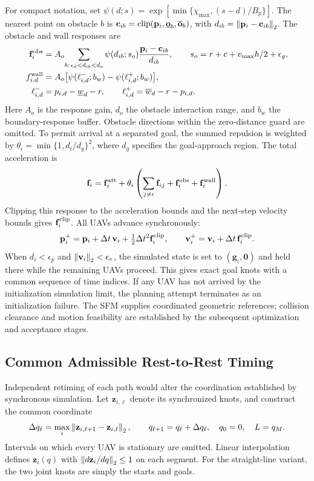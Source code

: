 For compact notation, set $\psi(d;s)=\exp[\min\{\chi_{\max},(s-d)/B_p\}]$. The nearest point on obstacle $b$ is $\mathbf c_{ib}=\operatorname{clip}(\mathbf{p}_i,\underline{\mathbf o}_b,\overline{\mathbf o}_b)$, with $d_{ib}=\left\lVert \mathbf{p}_i-\mathbf c_{ib}\right\rVert_2$. The obstacle and wall responses are
\begin{subequations}\label{eq:obstacle-forces}\begin{align}
 \mathbf f_i^{\rm obs}
 &=A_o\!\sum_{b:\,\epsilon_d<d_{ib}<d_o}
 \psi(d_{ib};s_o)\frac{\mathbf{p}_i-\mathbf c_{ib}}{d_{ib}},
 \qquad s_o=r+c+v_{\max}h/2+\epsilon_g,\\
 f_{i,d}^{\rm wall}
 &=A_o\big[\psi(\ell_{i,d}^{-};b_w)-\psi(\ell_{i,d}^{+};b_w)\big],\\
 \ell_{i,d}^{-}&=p_{i,d}-\underline w_d-r,\qquad
 \ell_{i,d}^{+}=\overline w_d-r-p_{i,d}.
\end{align}\end{subequations}
Here $A_o$ is the response gain, $d_o$ the obstacle interaction range, and $b_w$ the boundary-response buffer. Obstacle directions within the zero-distance guard are omitted. To permit arrival at a separated goal, the summed repulsion is weighted by $\theta_i=\min\{1,d_i/d_g\}^2$, where $d_g$ specifies the goal-approach region. The total acceleration is
\[
 \mathbf f_i=\mathbf f_i^{\rm att}
 +\theta_i\left(\sum_{j\ne i}\mathbf f_{ij}
 +\mathbf f_i^{\rm obs}+\mathbf f_i^{\rm wall}\right).
\]
Clipping this response to the acceleration bounds and the next-step velocity bounds gives $\mathbf f_i^{\rm clip}$. All UAVs advance synchronously:
\begin{equation}
 \mathbf{p}_i^+=\mathbf{p}_i+\Delta t\,\mathbf{v}_i+\tfrac12\Delta t^2\mathbf f_i^{\rm clip},
 \qquad \mathbf{v}_i^+=\mathbf{v}_i+\Delta t\,\mathbf f_i^{\rm clip}.
 \label{eq:simulation}
\end{equation}
When $d_i<\epsilon_p$ and $\left\lVert \mathbf{v}_i\right\rVert_2<\epsilon_v$, the simulated state is set to $(\mathbf g_i,\mathbf0)$ and held there while the remaining UAVs proceed. This gives exact goal knots with a common sequence of time indices. If any UAV has not arrived by the initialization simulation limit, the planning attempt terminates as an initialization failure. The SFM supplies coordinated geometric references; collision clearance and motion feasibility are established by the subsequent optimization and acceptance stages.

\subsection{Common Admissible Rest-to-Rest Timing}
Independent retiming of each path would alter the coordination established by synchronous simulation. Let $\mathbf z_{i,\ell}$ denote its synchronized knots, and construct the common coordinate
\begin{equation}
 \Delta q_\ell=\max_i\left\lVert \mathbf z_{i,\ell+1}-\mathbf z_{i,\ell}\right\rVert_2,
 \qquad q_{\ell+1}=q_\ell+\Delta q_\ell,\quad q_0=0,\quad L=q_M.
 \label{eq:jointclock}
\end{equation}
Intervals on which every UAV is stationary are omitted. Linear interpolation defines $\mathbf z_i(q)$ with $\left\lVert d\mathbf z_i/dq\right\rVert_2\leq1$ on each segment. For the straight-line variant, the two joint knots are simply the starts and goals.


